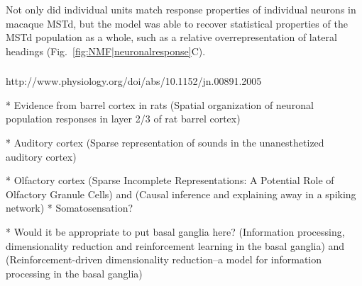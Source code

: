 
Not only did individual units match response properties of individual neurons
in macaque \ac{MSTd},
but the model was able to recover statistical properties of the \ac{MSTd}
population as a whole, such as a relative overrepresentation of lateral
headings (Fig.~\ref{fig:NMF|neuronalresponse}C).


\subsubsection*{}


http://www.physiology.org/doi/abs/10.1152/jn.00891.2005



* Evidence from barrel cortex in rats (Spatial organization of neuronal population responses in layer 2/3 of rat barrel cortex)

* Auditory cortex (Sparse representation of sounds in the unanesthetized auditory cortex)

* Olfactory cortex (Sparse Incomplete Representations: A Potential Role of Olfactory Granule Cells) and (Causal inference and explaining away in a spiking network)
* Somatosensation?


* Would it be appropriate to put basal ganglia here? (Information processing, dimensionality reduction and reinforcement learning in the basal ganglia) and (Reinforcement-driven dimensionality reduction–a model for information processing in the basal ganglia)

